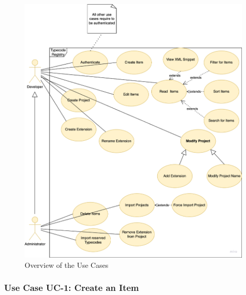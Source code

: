 \begin{figure}[H]
\hspace*{-0.5cm}\includegraphics[scale=0.43]{images/introduction/use_cases}
\caption{Overview of the Use Cases}
\label{fig:use-cases}
\end{figure}


\subsubsection{Use Case UC-1: Create an Item}\label{subsubsec:use-case-uc-1:-create-an-item}

